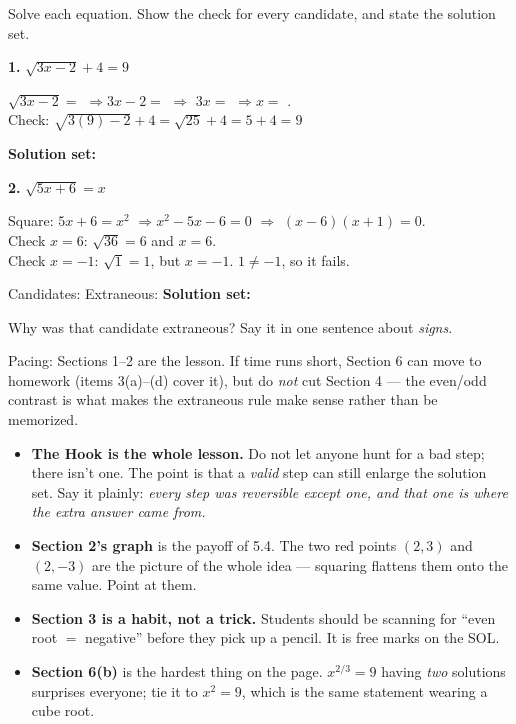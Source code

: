 \documentclass[10pt]{article}
\begin{document}
\begin{practicebox}
Solve each equation. Show the check for every candidate, and state the solution set.

\vspace{4pt}
\textbf{1.} $\sqrt{3x-2}+4=9$

{\small
$\sqrt{3x-2}=$  \quad$\Rightarrow$\quad $3x-2=$  \quad$\Rightarrow$\quad
$3x=$  \quad$\Rightarrow$\quad $x=$ . \\
Check: $\sqrt{3(9)-2}+4=\sqrt{25}+4=5+4=9$ \; \checkmark}

\vspace{4pt}
\textbf{Solution set:} 

\vspace{6pt}
\textbf{2.} $\sqrt{5x+6}=x$

{\small
Square: $5x+6=x^{2}$ \quad$\Rightarrow$\quad $x^{2}-5x-6=0$ \quad$\Rightarrow$\quad
$(x-6)(x+1)=0$. \\
Check $x=6$: \; $\sqrt{36}=6$ and $x=6$. \; \checkmark \\
Check $x=-1$: \; $\sqrt{1}=1$, but $x=-1$. \; $1\ne-1$, so it fails.}

\vspace{4pt}
Candidates:  \quad Extraneous:  \quad \textbf{Solution set:}

\vspace{4pt}
Why was that candidate extraneous? Say it in one sentence about \emph{signs}.
\end{practicebox}

\begin{teachernote}
\small Pacing: Sections 1--2 are the lesson. If time runs short, Section 6 can move to homework
(items 3(a)--(d) cover it), but do \emph{not} cut Section 4 --- the even/odd contrast is what makes
the extraneous rule make sense rather than be memorized.
\begin{itemize}[leftmargin=1.3em, nosep]
  \item \textbf{The Hook is the whole lesson.} Do not let anyone hunt for a bad step; there isn't
        one. The point is that a \emph{valid} step can still enlarge the solution set. Say it
        plainly: \emph{every step was reversible except one, and that one is where the extra answer
        came from.}
  \item \textbf{Section 2's graph} is the payoff of 5.4. The two red points $(2,3)$ and $(2,-3)$ are
        the picture of the whole idea --- squaring flattens them onto the same value. Point at them.
  \item \textbf{Section 3 is a habit, not a trick.} Students should be scanning for
        ``even root $=$ negative'' before they pick up a pencil. It is free marks on the SOL.
  \item \textbf{Section 6(b)} is the hardest thing on the page. $x^{2/3}=9$ having \emph{two}
        solutions surprises everyone; tie it to $x^{2}=9$, which is the same statement wearing a
        cube root.
\end{itemize}
\end{teachernote}
\end{document}
